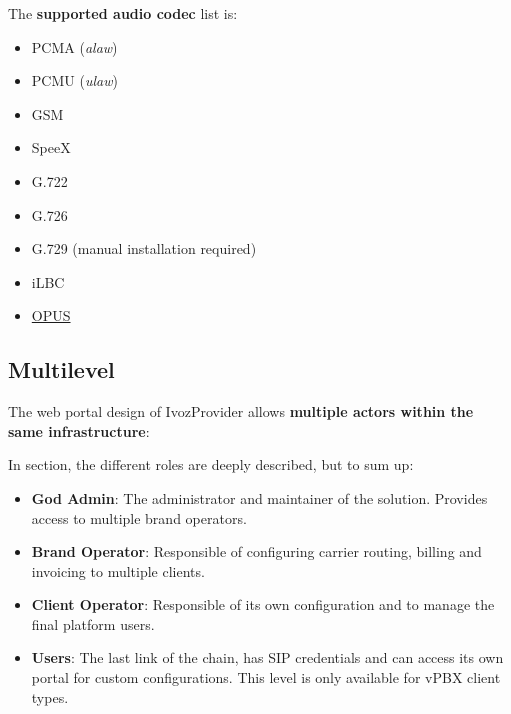 \documentclass[letterpaper,10pt,english]{sphinxmanual}
\begin{document}
The \textbf{supported audio codec} list is:
\begin{itemize}
\item {} 
PCMA (\emph{alaw})

\item {} 
PCMU (\emph{ulaw})

\item {} 
GSM

\item {} 
SpeeX

\item {} 
G.722

\item {} 
G.726

\item {} 
G.729 (manual installation required)

\item {} 
iLBC

\item {} 
\href{http://opus-codec.org/}{OPUS}

\end{itemize}


\subsection{Multilevel}
\label{basic_concepts/intro/what_is_ivozprovider:multilevel}
The web portal design of IvozProvider allows \textbf{multiple actors within the
same infrastructure}:

\noindent{}

In {\hyperref[basic_concepts/operation_roles/index:operation\string-roles]{}} section, the different roles are deeply
described, but to sum up:
\begin{itemize}
\item {} 
\textbf{God Admin}: The administrator and maintainer of the solution. Provides
access to multiple brand operators.

\item {} 
\textbf{Brand Operator}: Responsible of configuring carrier routing, billing and invoicing to
multiple clients.

\item {} 
\textbf{Client Operator}: Responsible of its own configuration and to manage the final platform users.

\item {} 
\textbf{Users}: The last link of the chain, has SIP credentials and can access
its own portal for custom configurations. This level is only available for vPBX client types.

\end{itemize}
\end{document}
